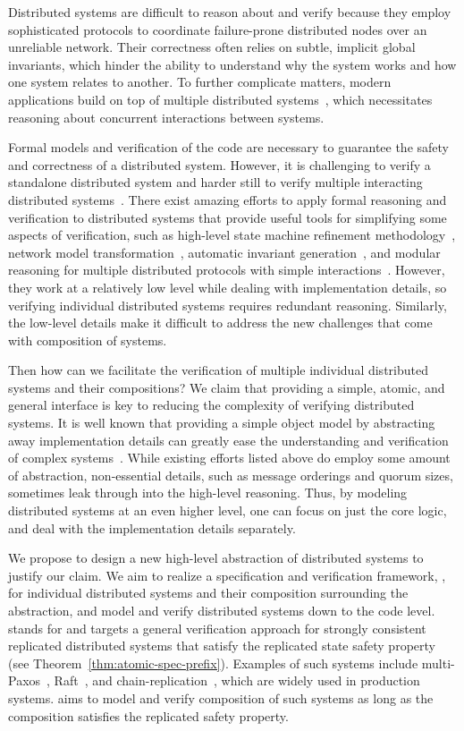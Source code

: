 \documentclass[11pt]{article}
\begin{document}
Distributed systems are difficult to reason about and verify because
they employ sophisticated protocols to coordinate failure-prone
distributed nodes over an unreliable network.  Their correctness often
relies on subtle, implicit global invariants, which hinder the ability
to understand why the system works and how one system relates to
another. To further complicate matters, modern applications build on
top of multiple distributed systems~\cite{hadoop, hadoopeco}, which
necessitates reasoning about concurrent interactions between systems.


Formal models and verification of the code are necessary to guarantee
the safety and correctness of a distributed system. However, it is
challenging to verify a standalone distributed system and harder still
to verify multiple interacting distributed
systems~\cite{shimlayer}. There exist amazing efforts to apply formal
reasoning and verification to distributed systems that provide useful
tools for simplifying some aspects of verification, such as high-level
state machine refinement methodology~\cite{ironfleet}, network model
transformation~\cite{verdi}, automatic invariant generation~\cite{i4},
and modular reasoning for multiple distributed protocols with simple
interactions~\cite{disel}. However, they work at a relatively low
level while dealing with implementation details, so verifying
individual distributed systems requires redundant
reasoning. Similarly, the low-level details make it difficult to
address the new challenges that come with composition of systems.

Then how can we facilitate the verification of multiple individual
distributed systems and their compositions? We claim that providing a
simple, atomic, and general interface is key to reducing the
complexity of verifying distributed systems. It is well known that
providing a simple object model by abstracting away implementation
details can greatly ease the understanding and verification of complex
systems~\cite{herlihy90, herlihy08book, wormspace, concurrency}. While
existing efforts listed above do employ some amount of abstraction,
non-essential details, such as message orderings and quorum sizes,
sometimes leak through into the high-level reasoning.  Thus, by
modeling distributed systems at an even higher level, one can focus on
just the core logic, and deal with the implementation details
separately.

We propose to design a new high-level abstraction of distributed
systems to justify our claim. We aim to realize a specification and
verification framework, \sysname{}, for individual distributed systems
and their composition surrounding the abstraction, and model and
verify distributed systems down to the code level.  \sysname{} stands
for \sysnamelong{} and targets a general verification approach for
strongly consistent replicated distributed systems that satisfy the
replicated state safety property (see
Theorem~\ref{thm:atomic-spec-prefix}).  Examples of such systems
include multi-Paxos~\cite{rvrpaxos}, Raft~\cite{raft}, and
chain-replication~\cite{chainreplication}, which are widely used in
production systems.  \sysname{} aims to model and verify composition
of such systems as long as the composition satisfies the replicated
safety property.
\end{document}
